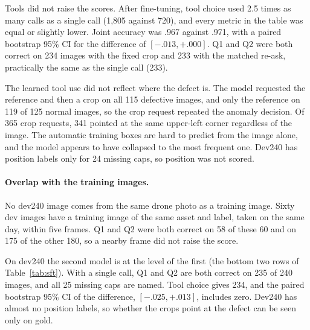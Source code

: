\documentclass[11pt]{article}
\begin{document}
Tools did not raise the scores. After fine-tuning, tool choice used 2.5 times as many calls as a single call (1,805 against 720), and every metric in the table was equal or slightly lower. Joint accuracy was .967 against .971, with a paired bootstrap 95\% CI for the difference of $[-.013,+.000]$. Q1 and Q2 were both correct on 234 images with the fixed crop and 233 with the matched re-ask, practically the same as the single call (233).

The learned tool use did not reflect where the defect is. The model requested the reference and then a crop on all 115 defective images, and only the reference on 119 of 125 normal images, so the crop request repeated the anomaly decision. Of 365 crop requests, 341 pointed at the same upper-left corner regardless of the image. The automatic training boxes are hard to predict from the image alone, and the model appears to have collapsed to the most frequent one. Dev240 has position labels only for 24 missing caps, so position was not scored.

\paragraph{Overlap with the training images.} No dev240 image comes from the same drone photo as a training image. Sixty dev images have a training image of the same asset and label, taken on the same day, within five frames. Q1 and Q2 were both correct on 58 of these 60 and on 175 of the other 180, so a nearby frame did not raise the score.

On dev240 the second model is at the level of the first (the bottom two rows of Table~\ref{tab:sft}). With a single call, Q1 and Q2 are both correct on 235 of 240 images, and all 25 missing caps are named. Tool choice gives 234, and the paired bootstrap 95\% CI of the difference, $[-.025,+.013]$, includes zero. Dev240 has almost no position labels, so whether the crops point at the defect can be seen only on gold.
\end{document}
